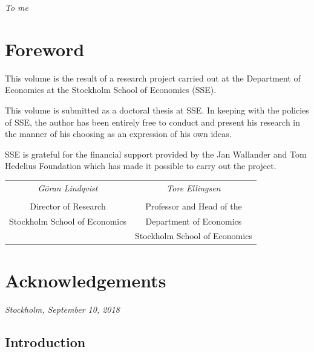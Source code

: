 \documentclass[twoside,11pt,american,openright,final]{memoir}
\begin{document}
\cleardoublepage
\thispagestyle{empty}
\vspace*{45mm}
\begin{center}
\textit{To me}
\end{center}

\cleardoublepage
\chapter*{Foreword}\thispagestyle{empty}
This volume is the result of a research project carried out at the Department of Economics at the Stockholm School of Economics (SSE).

This volume is submitted as a doctoral thesis at SSE. In keeping with the policies of SSE, the author has been entirely free to conduct and present his research in the manner of his choosing as an expression of his own ideas.

SSE is grateful for the financial support provided by the Jan Wallander and Tom Hedelius Foundation which has made it possible to carry out the project.

\vspace{2\onelineskip}

\begin{tabular}{cc}
\emph{Göran Lindqvist} & \emph{Tore Ellingsen}\\
& \\
Director of Research & Professor and Head of the\\
Stockholm School of Economics & Department of Economics\\
& Stockholm School of Economics
\end{tabular}
\cleardoublepage

\chapter*{Acknowledgements}\thispagestyle{empty}
\par\bigskip
\begin{center}
\emph{Stockholm, September 10, 2018}\par\smallskip
\emph{\theauthor}
\end{center}
\cleardoublepage

\tableofcontents*%
\cleardoublepage%
\mainmatter%

\begin{refsection}
\chapter*{Introduction}

\clearpage
\nobibintoc{}\bibintoc
\end{refsection}
\end{document}
